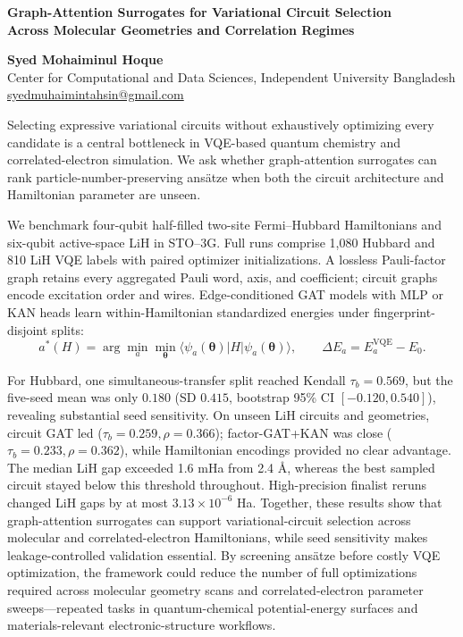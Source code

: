 \documentclass[11pt,a4paper]{article}
\newcommand{\tightheading}[1]{\vspace{1pt}{\bfseries\color{navy}#1}\par\vspace{-2pt}}
\begin{document}
\begin{center}
{\fontsize{15.5}{17}\selectfont\bfseries\color{navy}
Graph-Attention Surrogates for Variational Circuit Selection\\
Across Molecular Geometries and Correlation Regimes\par}
\vspace{3pt}
{\bfseries Syed Mohaiminul Hoque}\\
Center for Computational and Data Sciences, Independent University Bangladesh\\
\href{mailto:syedmuhaimintahsin@gmail.com}{syedmuhaimintahsin@gmail.com}
\end{center}
\vspace{-2pt}

\tightheading{Abstract}
Selecting expressive variational circuits without exhaustively optimizing every
candidate is a central bottleneck in VQE-based quantum chemistry and
correlated-electron simulation. We ask whether
graph-attention surrogates can rank particle-number-preserving ans\"atze when both the
circuit architecture and Hamiltonian parameter are unseen.

We benchmark four-qubit half-filled two-site Fermi--Hubbard Hamiltonians and six-qubit
active-space LiH in STO--3G. Full runs comprise 1,080 Hubbard and 810 LiH VQE labels
with paired optimizer initializations. A lossless Pauli-factor graph retains every
aggregated Pauli word, axis, and coefficient; circuit graphs encode excitation order
and wires. Edge-conditioned GAT models with MLP or KAN heads learn
within-Hamiltonian standardized energies under fingerprint-disjoint splits:
\vspace{-3pt}
\[
 a^*(H)=\arg\min_a\min_{\boldsymbol\theta}
 \langle\psi_a(\boldsymbol\theta)|H|\psi_a(\boldsymbol\theta)\rangle,
 \qquad \Delta E_a=E_a^{\mathrm{VQE}}-E_0.
\]
\vspace{-7pt}

For Hubbard, one simultaneous-transfer split reached Kendall
\(\tau_b=0.569\), but the five-seed mean was only \(0.180\)
(SD \(0.415\), bootstrap 95\% CI \([-0.120,0.540]\)), revealing substantial
seed sensitivity. On unseen LiH circuits and geometries, circuit GAT led
(\(\tau_b=0.259,\rho=0.366\)); factor-GAT+KAN was close
(\(\tau_b=0.233,\rho=0.362\)), while Hamiltonian encodings provided no clear
advantage. The median LiH gap exceeded 1.6 mHa from 2.4 \AA, whereas the best sampled
circuit stayed below this threshold throughout. High-precision finalist reruns changed
LiH gaps by at most \(3.13\times10^{-6}\) Ha. Together, these results show that
graph-attention surrogates can support variational-circuit selection across molecular
and correlated-electron Hamiltonians, while seed sensitivity makes leakage-controlled
validation essential. By screening ans\"atze before costly VQE optimization, the
framework could reduce the number of full optimizations required across molecular
geometry scans and correlated-electron parameter sweeps---repeated tasks in
quantum-chemical potential-energy surfaces and materials-relevant electronic-structure
workflows.
\end{document}
